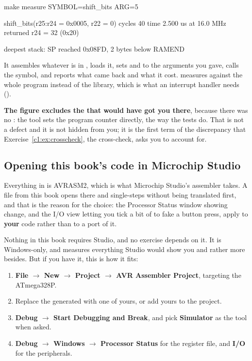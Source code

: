\begin{shell}
make measure SYMBOL=shift_bits ARG=5
\end{shell}

\begin{console}
shift_bits(r25:r24 = 0x0005, r22 = 0)
  cycles     40
  time       2.500 us at 16.0 MHz
  returned   r24 = 32 (0x20)

deepest stack: SP reached 0x08FD, 2 bytes below RAMEND
\end{console}

It assembles whatever is in , loads it, sets  and 
to the arguments you gave, calls the symbol, and reports what came back and what it cost.
 measures against the whole program instead of the library, which is what an
interrupt handler needs ().

\textbf{The figure excludes the  that would have got you there}, because there was no
: the tool sets the program counter directly, the way the tests do. That is not a
defect and it is not hidden from you; it is the first term of the discrepancy that
Exercise~\ref{c1:ex:crosscheck}, the cross-check, asks you to account for.

\subsection{Opening this book's code in Microchip Studio}
\label{c1:sec:studio}
Everything in  is AVRASM2, which is what Microchip Studio's assembler takes.
A file from this book opens there and single-steps without being translated first, and that is
the reason for the choice: the Processor Status window showing  change, and the I/O
view letting you tick a bit of  to fake a button press, apply to \textbf{your} code
rather than to a port of it.

Nothing in this book requires Studio, and no exercise depends on it. It is Windows-only, and
 measures everything Studio would show you and rather more besides. But if you
have it, this is how it fits:
\begin{enumerate}
  \item \textbf{File $\rightarrow$ New $\rightarrow$ Project $\rightarrow$ AVR Assembler
    Project}, targeting the ATmega328P.
  \item Replace the generated  with one of yours, or add yours to the project.
  \item \textbf{Debug $\rightarrow$ Start Debugging and Break}, and pick \textbf{Simulator} as the
    tool when asked.
  \item \textbf{Debug $\rightarrow$ Windows $\rightarrow$ Processor Status} for the register file,
    and \textbf{I/O} for the peripherals.
\end{enumerate}


